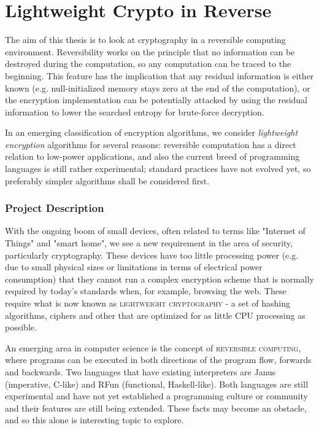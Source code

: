 \documentclass[a4paper]{article}
\renewenvironment{abstract}
 {\small
  \begin{center}
  \bfseries \abstractname\vspace{-.5em}\vspace{0pt}
  \end{center}
  \list{}{
    \setlength{\leftmargin}{.5cm}%
    \setlength{\rightmargin}{\leftmargin}%
  }%
  \item\relax}
 {\endlist}
\begin{document}
{
\part*{\center Lightweight Crypto in Reverse}
}

\begin{abstract}
The aim of this thesis is to look at cryptography in a 
reversible computing environment. Reversibility works on the principle 
that no information can be destroyed during the computation, so any 
computation can be traced to the beginning. This feature has the 
implication that any residual information is either known (e.g. 
null-initialized memory stays zero at the end of the computation), or 
the encryption implementation can be potentially attacked by using the 
residual information to lower the searched entropy for brute-force 
decryption.

In an emerging classification of encryption algorithms, we 
consider \textit{lightweight encryption} algorithms for several 
reasons: reversible computation has a direct relation to low-power 
applications, and also the current breed of programming languages is 
still rather experimental; standard practices have not evolved yet, so 
preferably simpler algorithms shall be considered first.
\end{abstract}


\section*{Project Description}

With the ongoing boom of small devices, often related to terms like 
"Internet of Things" and "smart home", we see a new requirement in the 
area of security, particularly cryptography. These devices have too 
little processing power (e.g. due to small physical sizes or 
limitations in terms of electrical power consumption) that they cannot 
run a complex encryption scheme that is normally required by today's 
standards when, for example, browsing the web. These require what is 
now known as \textsc{lightweight cryptography} - a set of hashing 
algorithms, ciphers and other that are optimized for as little CPU 
processing as possible.

An emerging area in computer science is the concept of 
\textsc{reversible computing}, where programs can be executed in both 
directions of the program flow, forwards and backwards. Two languages 
that have existing interpreters are Janus (imperative, C-like) and RFun 
(functional, Haskell-like). Both languages are still experimental and 
have not yet established a programming culture or community and their 
features are still being extended. These facts may become an obstacle, 
and so this alone is interesting topic to explore.
\end{document}
